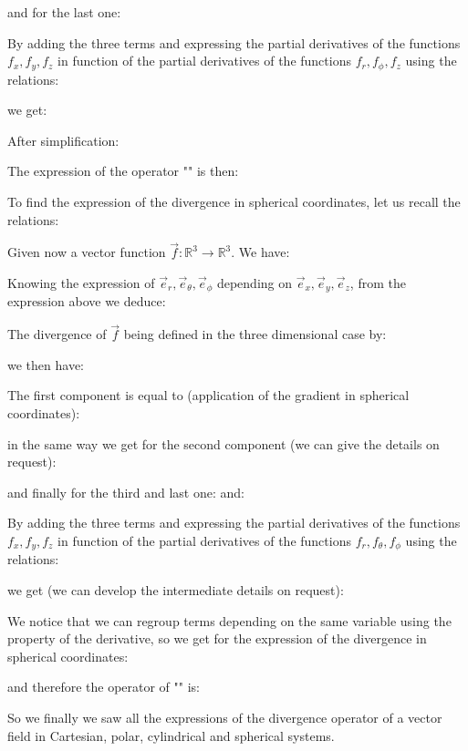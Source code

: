 	and for the last one:
	
	By adding the three terms and expressing the partial derivatives of the functions $f_x,f_y,f_z$ in function of the partial derivatives of the functions $f_r,f_\phi,f_z$ using the relations:
	
	we get:
	
	After simplification:
	
	The expression of the operator "" is then:
	
	To find the expression of the divergence in spherical coordinates, let us recall the relations:
	
	Given now a vector function $\vec{f}:\mathbb{R}^3\rightarrow \mathbb{R}^3$. We have:
	
	Knowing the expression of $\vec{e}_r,\vec{e}_\theta,\vec{e}_\phi$ depending on $\vec{e}_x,\vec{e}_y,\vec{e}_z$, from the expression above we deduce:
	
	The divergence of $\vec{f}$ being defined in the three dimensional case by:
	
	we then have:
	
	The first component is equal to (application of the gradient in spherical coordinates):
	
	in the same way we get for the second component (we can give the details on request):
	
	and finally for the third and last one:
	and:
	
	By adding the three terms and expressing the partial derivatives of the functions $f_x,f_y,f_z$ in function of the partial derivatives of the functions $f_r,f_\theta,f_\phi$ using the relations:
	
	we get (we can develop the intermediate details on request):
	
	We notice that we can regroup terms depending on the same variable using the property of the derivative, so we get for the expression of the divergence in spherical coordinates:
	
	and therefore the operator of "" is:
	
	So we finally we saw all the expressions of the divergence operator of a vector field in Cartesian, polar, cylindrical and spherical systems.
	
	\pagebreak
